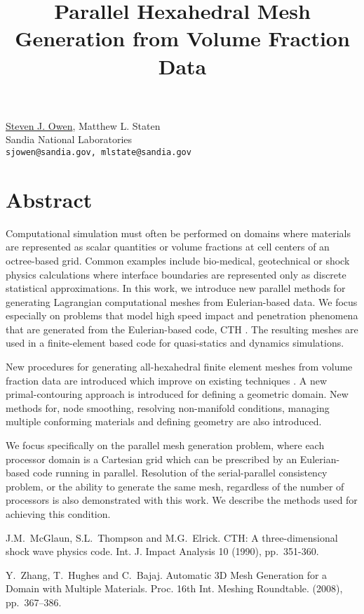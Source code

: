 \title{Parallel Hexahedral Mesh Generation from Volume Fraction Data}
\author{} \institute{}
\maketitle

\begin{center}
{\large \underline{Steven J. Owen}, Matthew L. Staten}\\
Sandia National Laboratories\\
{\tt sjowen@sandia.gov, mlstate@sandia.gov}\\
\end{center}

\section*{Abstract}
Computational simulation must often be performed on domains where materials are represented as scalar quantities or volume fractions at cell centers of an octree-based grid. Common examples include bio-medical, geotechnical or shock physics calculations where interface boundaries are represented only as discrete statistical approximations.  In this work, we introduce new parallel methods for generating Lagrangian computational meshes from Eulerian-based data. We focus especially on problems that model high speed impact and penetration phenomena that are generated from the Eulerian-based code, CTH \cite{CTH90}.  The resulting meshes are used in a finite-element based code for quasi-statics and dynamics simulations. 

New procedures for generating all-hexahedral finite element meshes from volume fraction data are introduced which improve on existing techniques \cite{Zhang08}. A new primal-contouring approach is introduced for defining a geometric domain. New methods for, node smoothing, resolving non-manifold conditions, managing multiple conforming materials and defining geometry are also introduced. 

We focus specifically on the parallel mesh generation problem, where each processor domain is a Cartesian grid which can be prescribed by an Eulerian-based code running in parallel.  Resolution of the serial-parallel consistency problem, or the ability to generate the same mesh, regardless of the number of processors is also demonstrated with this work. We describe the methods used for achieving this condition.


\begin{thebibliography}{10}
{\sc J.M.~McGlaun, S.L.~Thompson and M.G.~Elrick}. {CTH: A three-dimensional shock wave physics code}. Int. J. Impact Analysis 10 (1990), pp.~351-360.

{\sc Y.~Zhang, T.~Hughes and C.~Bajaj}. {Automatic 3D Mesh Generation for a Domain with Multiple Materials}. Proc. 16th Int. Meshing Roundtable. (2008), pp.~367--386.
\end{thebibliography}